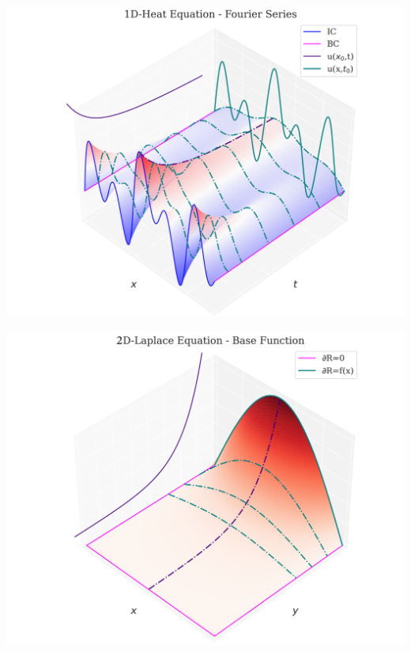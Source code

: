 \includegraphics[width=0.85\linewidth]{../images/1d_heat_fs.png}

\includegraphics[width=0.85\linewidth]{../images/2d_laplace.png}